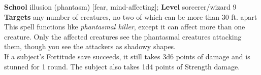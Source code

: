 \textbf{School} illusion (phantasm) [fear, mind-affecting]; \textbf{Level} sorcerer/wizard 9\\
\textbf{Targets} any number of creatures, no two of which can be more than 30 ft. apart\\
This spell functions like \textit{phantasmal killer}, except it can affect more than one creature. Only the affected creatures see the phantasmal creatures attacking them, though you see the attackers as shadowy shapes.\\
If a subject's Fortitude save succeeds, it still takes 3d6 points of damage and is stunned for 1 round. The subject also takes 1d4 points of Strength damage.\\
